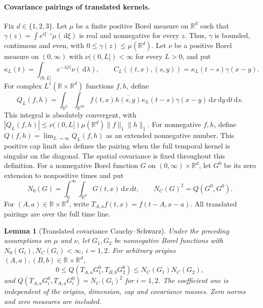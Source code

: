 \documentclass[12pt,oneside,openany]{book}
\makeatletter
\let\lean@pending\@empty
\newcommand{\LeanMarker}[1]{\gdef\lean@pending{#1}}
\numberwithin{equation}{section}
\newtheorem{lemma}[theorem]{Lemma}
\theoremstyle{nogostyle}
\theoremstyle{definition}
\newcommand{\R}{\mathbb{R}}
\newcommand{\ud}{\,\mathrm{d}}
\makeatother
\begin{document}
\paragraph{Covariance pairings of translated kernels.}
Fix $d \in \{1,2,3\}$. Let $\mu$ be a finite positive Borel measure on $\R^d$
such that $\gamma(z) = \int e^{i\xi\cdot z}\mu(\ud\xi)$ is real and nonnegative
for every $z$. Thus, $\gamma$ is bounded, continuous and even, with $0 \le
\gamma(z) \le \mu(\R^d)$. Let $\nu$ be a positive Borel measure on $(0,\infty)$
with $\nu((0,L]) < \infty$ for every $L > 0$, and put
\[
  \kappa_L(t)=\int_{(0,L]}e^{-\lambda|t|}\nu(\ud\lambda),\qquad
  C_L((t,x),(s,y))=\kappa_L(t-s)\gamma(x-y).
\]
For complex $L^1(\R\times\R^d)$ functions $f,h$, define
\begin{equation}\label{E:translated-covariance-form}
  Q_L(f,h)=\int_{\R^2}\int_{\R^{2d}}
  f(t,x)\overline{h(s,y)}\kappa_L(t-s)\gamma(x-y)
  \ud x\ud y\ud t\ud s.
\end{equation}
This integral is absolutely convergent, with $|Q_L(f,h)| \le
\nu((0,L])\mu(\R^d)\|f\|_1\|h\|_1$. For nonnegative $f,h$, define $Q(f,h) =
\lim_{L\to\infty}Q_L(f,h)$ as an extended nonnegative number. This positive cap
limit also defines the pairing when the full temporal kernel is singular on the
diagonal. The spatial covariance is fixed throughout this definition. For a
nonnegative Borel function $G$ on $(0,\infty)\times\R^d$, let $G^0$ be its zero
extension to nonpositive times and put
\[
  N_0(G)=\int_0^\infty\int_{\R^d}G(t,x)\ud x\ud t,\qquad
  N_C(G)^2=Q(G^0,G^0).
\]
For $(A,a) \in \R\times\R^d$, write $T_{A,a}f(t,x) = f(t-A,x-a)$. All translated
pairings are over the full time line.
\LeanMarker{L:translated-covariance-CS}%
\begin{lemma}[Translated covariance Cauchy--Schwarz]
  \label{L:translated-covariance-CS}
  Under the preceding assumptions on $\mu$ and $\nu$, let $G_1,G_2$ be
  nonnegative Borel functions with $N_0(G_i),N_C(G_i) < \infty$, $i = 1,2$. For
  arbitrary origins $(A,a),(B,b) \in \R\times\R^d$,
  \begin{equation}\label{E:translated-covariance-CS}
    0\le Q(T_{A,a}G_1^0,T_{B,b}G_2^0)\le N_C(G_1)N_C(G_2),
  \end{equation}
  and $Q(T_{A,a}G_i^0,T_{A,a}G_i^0) = N_C(G_i)^2$ for $i = 1,2$. The coefficient
  one is independent of the origins, dimension, cap and covariance masses. Zero
  norms and zero measures are included.
\end{lemma}
\end{document}
